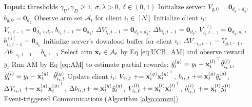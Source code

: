 \begin{algorithm}[h]
    \caption{\modeltwo{}} \label{algo:AsyncLinUCB_AM}
  \begin{algorithmic}[1]
    \STATE \textbf{Input:} thresholds $\gamma_{U}, \gamma_{D} \geq 1$, $\sigma, \lambda > 0$, $\delta \in (0,1)$
    \STATE Initialize server: ${V}_{g, 0}=\textbf{0}_{d_{g} \times d_{g}}$, ${b}_{g,0}=\textbf{0}_{d_{g}}$
        \STATE Observe arm set $\mathcal{A}_{t}$ for client $i_{t} \in [N]$
            \STATE Initialize client $i_{t}$: ${V}_{i_{t}, t-1}=\textbf{0}_{d_{g} \times d_{g}}$, ${b}_{i_{t},t-1}=\textbf{0}_{d_{g}}$, $\Delta{V}_{i_{t}, t-1}=\textbf{0}_{d_{g} \times d_{g}}$, $\Delta{b}_{i_{t},t-1}=\textbf{0}_{d_{g}}$, ${V}^{(l)}_{i_{t},t-1}=\textbf{0}_{d_{i_{t}},d_{i_{t}}}$, ${b}^{(l)}_{i_{t},t-1}=\textbf{0}_{d_{i_{t}}}$
            \STATE Initialize server's download buffer for client $i_{t}$: $\Delta{V}_{-i_{t}, t-1}=V_{g,t-1}$, $\Delta{b}_{-i_{t},t-1}=b_{g,t-1}$
        \ENDIF
        \STATE Select arm $\mathbf{x}_{t}\in\mathcal{A}_{t}$ by Eq \eqref{eq:UCB_AM} and observe reward $y_{t}$
        \STATE Run AM by Eq \eqref{eq:AM} to estimate partial rewards:  $\hat{y}^{(g)}_{t}=y_{t}-{\mathbf{x}_{t}^{(l)}}^{\top} \hat{\theta}^{(l)}_{i_{t},t}$, $\hat{y}^{(l)}_{t}=y_{t}-{\mathbf{x}_{t}^{(g)}}^{\top} \hat{\theta}^{(g)}_{i_{t},t}$
        \STATE Update client $i_{t}$: ${V}_{i_{t},t} \mathrel{+}= \mathbf{x}_{t}^{(g)}{\mathbf{x}_{t}^{(g)}}^{\top}$, ${b}_{i_{t},t} \mathrel{+}= \mathbf{x}^{(g)}_{t} \hat{y}^{(g)}_{t}$, $\Delta{V}_{i_{t},t} \mathrel{+}= \mathbf{x}_{t}^{(g)}{\mathbf{x}_{t}^{(g)}}^{\top}$, $\Delta{b}_{i_{t},t}+=\mathbf{x}^{(g)}_{t} \hat{y}^{(g)}_{t}$, ${V}^{(l)}_{i_{t},t} \mathrel{+}= \mathbf{x}_{t}^{(l)}{\mathbf{x}_{t}^{(l)}}^{\top}$, ${b}^{(l)}_{i_{t},t} \mathrel{+}= \mathbf{x}^{(l)}_{t} \hat{y}^{(l)}_{t}$ 
        \STATE Event-triggered Communications (Algorithm \ref{algo:comm})


\end{algorithmic}
\end{algorithm}
